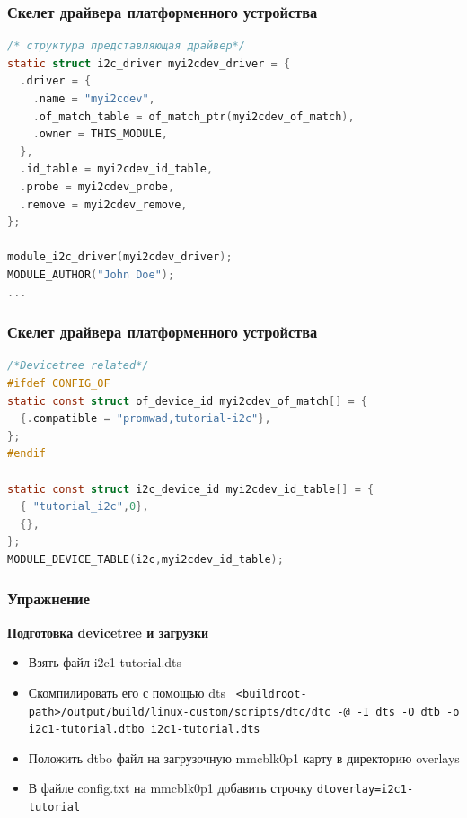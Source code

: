 \begin{frame}[fragile]
  \frametitle{Скелет драйвера платформенного устройства}
\begin{lstlisting}[language=C]
/* структура представляющая драйвер*/
static struct i2c_driver myi2cdev_driver = {
  .driver = {
    .name = "myi2cdev",
    .of_match_table = of_match_ptr(myi2cdev_of_match),
    .owner = THIS_MODULE,
  },
  .id_table = myi2cdev_id_table,
  .probe = myi2cdev_probe,
  .remove = myi2cdev_remove,
};

module_i2c_driver(myi2cdev_driver);
MODULE_AUTHOR("John Doe");
...
\end{lstlisting}
\end{frame}

\begin{frame}[fragile]
  \frametitle{Скелет драйвера платформенного устройства}
\begin{lstlisting}[language=C]
/*Devicetree related*/
#ifdef CONFIG_OF
static const struct of_device_id myi2cdev_of_match[] = {
  {.compatible = "promwad,tutorial-i2c"},
};
#endif

static const struct i2c_device_id myi2cdev_id_table[] = {
  { "tutorial_i2c",0},
  {},
};
MODULE_DEVICE_TABLE(i2c,myi2cdev_id_table);
\end{lstlisting}
\end{frame}

\begin{frame}[fragile]
  \frametitle{Упражнение}
  \begin{center}
      \textbf{Подготовка devicetree и загрузки}
  \end{center}
  \begin{itemize}
     \item Взять файл i2c1-tutorial.dts
     \item Скомпилировать его с помощью dts 
      \verb+ <buildroot-path>/output/build/linux-custom/scripts/dtc/dtc -@ -I dts -O dtb -o i2c1-tutorial.dtbo i2c1-tutorial.dts+
     \item Положить dtbo файл на загрузочную mmcblk0p1 карту в директорию overlays
     \item В файле config.txt на mmcblk0p1 добавить строчку \verb+dtoverlay=i2c1-tutorial+
  \end{itemize}
\end{frame}

